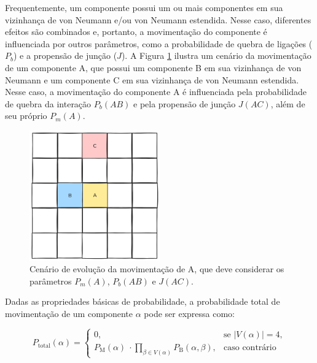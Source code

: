 \documentclass[12pt,oneside]{report}
\begin{document}
Frequentemente, um componente possui um ou mais componentes em sua vizinhança de von Neumann e/ou von Neumann estendida. Nesse caso, diferentes efeitos são combinados e, portanto, a movimentação do componente é influenciada por outros parâmetros, como a probabilidade de quebra de ligações (\hyperref[subsubsec:Pb]{$P_b$}) e a propensão de junção (\hyperref[subsubsec:J]{$J$}). A Figura \ref{fig:evolucao_Pm_Pb_J} ilustra um cenário da movimentação de um componente A, que possui um componente B em sua vizinhança de von Neumann e um componente C em sua vizinhança de von Neumann estendida. Nesse caso, a movimentação do componente A é influenciada pela probabilidade de quebra da interação $P_b (AB)$ e pela propensão de junção $J(AC)$, além de seu próprio $P_m (A)$.

\begin{figure}[H]
    \centering
    \includegraphics[width=0.5\textwidth]{evolucao_Pm_Pb_J.png}
    \caption{\small Cenário de evolução da movimentação de A, que deve considerar os parâmetros $P_m (A)$, $P_b (AB)$ e $J(AC)$.}
    \label{fig:evolucao_Pm_Pb_J}
\end{figure}

Dadas as propriedades básicas de probabilidade, a probabilidade total de movimentação de um componente $\alpha$ pode ser expressa como:

\begin{equation}
    \label{eq:pmov_total}
    P_\text{total}(\alpha) =
    \begin{cases}
        0,                                                                                            & \text{se } \left| V(\alpha) \right| = 4, \\[2ex]
        P_\text{M}(\alpha)\ \cdot \displaystyle\prod_{\beta \in V(\alpha)} P_\text{B}(\alpha, \beta), & \text{caso contrário}
    \end{cases}
\end{equation}
\end{document}
